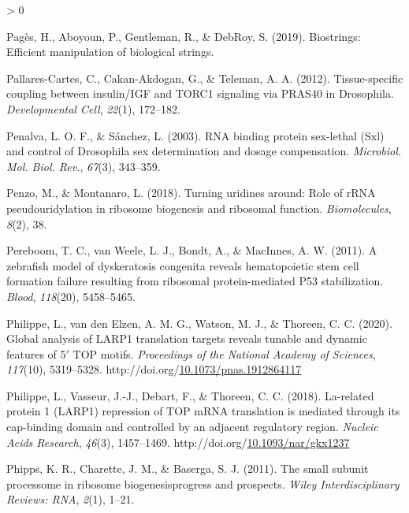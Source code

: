 \documentclass[12pt,oneside]{reedthesis}
\newlength{\cslhangindent}
\newenvironment{CSLReferences}[2] %
 {%
  \setlength{\parindent}{0pt}
  \ifodd #1 \everypar{\setlength{\hangindent}{\cslhangindent}}\ignorespaces\fi
  \ifnum #2 > 0
  \setlength{\parskip}{#2\baselineskip}
  \fi
 }%
 {}
\begin{document}
\begin{CSLReferences}{1}{0}
\leavevmode\hypertarget{ref-pagesBiostringsEfficientManipulation2019}{}%
Pagès, H., Aboyoun, P., Gentleman, R., \& DebRoy, S. (2019). Biostrings: {Efficient} manipulation of biological strings.

\leavevmode\hypertarget{ref-Pallares-Cartes2012a}{}%
Pallares-Cartes, C., Cakan-Akdogan, G., \& Teleman, A. A. (2012). Tissue-specific coupling between insulin/{IGF} and {TORC1} signaling via {PRAS40} in {Drosophila}. \emph{Developmental Cell}, \emph{22}(1), 172--182.

\leavevmode\hypertarget{ref-Penalva2003}{}%
Penalva, L. O. F., \& Sánchez, L. (2003). {RNA} binding protein sex-lethal ({Sxl}) and control of {Drosophila} sex determination and dosage compensation. \emph{Microbiol. Mol. Biol. Rev.}, \emph{67}(3), 343--359.

\leavevmode\hypertarget{ref-Penzo2018}{}%
Penzo, M., \& Montanaro, L. (2018). Turning uridines around: {Role} of {rRNA} pseudouridylation in ribosome biogenesis and ribosomal function. \emph{Biomolecules}, \emph{8}(2), 38.

\leavevmode\hypertarget{ref-Pereboom2011a}{}%
Pereboom, T. C., van Weele, L. J., Bondt, A., \& MacInnes, A. W. (2011). A zebrafish model of dyskeratosis congenita reveals hematopoietic stem cell formation failure resulting from ribosomal protein-mediated P53 stabilization. \emph{Blood}, \emph{118}(20), 5458--5465.

\leavevmode\hypertarget{ref-philippeGlobalAnalysisLARP12020}{}%
Philippe, L., van den Elzen, A. M. G., Watson, M. J., \& Thoreen, C. C. (2020). Global analysis of {LARP1} translation targets reveals tunable and dynamic features of 5{\({'}\)} {TOP} motifs. \emph{Proceedings of the National Academy of Sciences}, \emph{117}(10), 5319--5328. http://doi.org/\href{https://doi.org/10.1073/pnas.1912864117}{10.1073/pnas.1912864117}

\leavevmode\hypertarget{ref-philippeLarelatedProteinLARP12018}{}%
Philippe, L., Vasseur, J.-J., Debart, F., \& Thoreen, C. C. (2018). La-related protein 1 ({LARP1}) repression of {TOP mRNA} translation is mediated through its cap-binding domain and controlled by an adjacent regulatory region. \emph{Nucleic Acids Research}, \emph{46}(3), 1457--1469. http://doi.org/\href{https://doi.org/10.1093/nar/gkx1237}{10.1093/nar/gkx1237}

\leavevmode\hypertarget{ref-Phipps2011a}{}%
Phipps, K. R., Charette, J. M., \& Baserga, S. J. (2011). The small subunit processome in ribosome biogenesis{}progress and prospects. \emph{Wiley Interdisciplinary Reviews: RNA}, \emph{2}(1), 1--21.


\end{CSLReferences}
\end{document}
